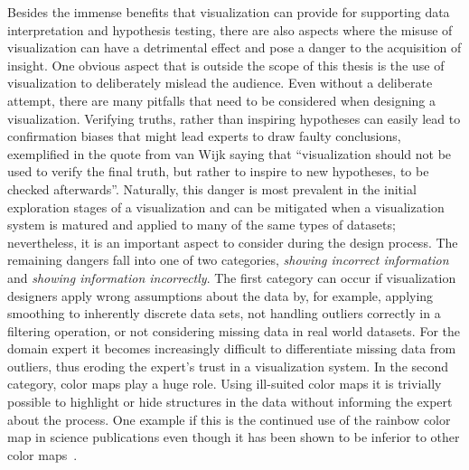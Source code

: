 Besides the immense benefits that visualization can provide for supporting data interpretation and hypothesis testing, there are also aspects where the misuse of visualization can have a detrimental effect and pose a danger to the acquisition of insight.  One obvious aspect that is outside the scope of this thesis is the use of visualization to deliberately mislead the audience.  Even without a deliberate attempt, there are many pitfalls that need to be considered when designing a visualization.  Verifying truths, rather than inspiring hypotheses can easily lead to confirmation biases that might lead experts to draw faulty conclusions, exemplified in the quote from van Wijk saying that ``visualization should not be used to verify the final truth, but rather to inspire to new hypotheses, to be checked afterwards''.  Naturally, this danger is most prevalent in the initial exploration stages of a visualization and can be mitigated when a visualization system is matured and applied to many of the same types of datasets; nevertheless, it is an important aspect to consider during the design process.  The remaining dangers fall into one of two categories, \emph{showing incorrect information} and \emph{showing information incorrectly}.  The first category can occur if visualization designers apply wrong assumptions about the data by, for example, applying smoothing to inherently discrete data sets, not handling outliers correctly in a filtering operation, or not considering missing data in real world datasets.  For the domain expert it becomes increasingly difficult to differentiate missing data from outliers, thus eroding the expert's trust in a visualization system.  In the second category, color maps play a huge role.  Using ill-suited color maps it is trivially possible to highlight or hide structures in the data without informing the expert about the process.  One example if this is the continued use of the rainbow color map in science publications even though it has been shown to be inferior to other color maps~\cite{borland2007rainbow}.



